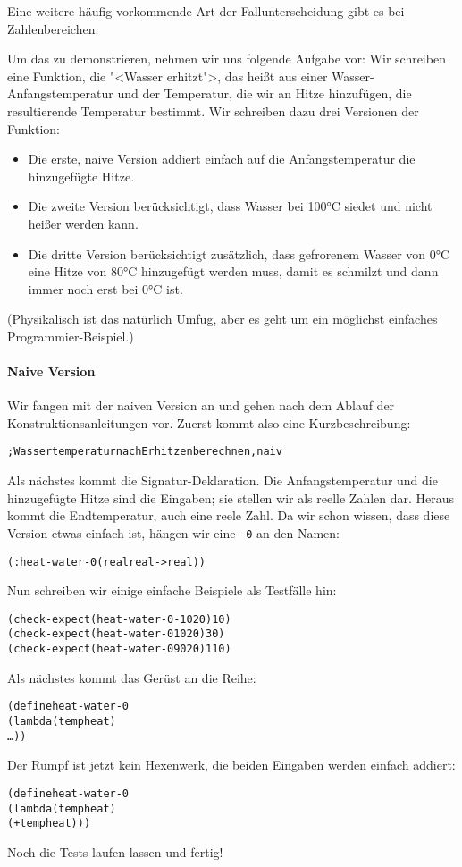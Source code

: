 Eine weitere häufig vorkommende Art der Fallunterscheidung gibt es bei
Zahlenbereichen.

Um das zu demonstrieren, nehmen wir uns folgende Aufgabe vor: Wir
schreiben eine Funktion, die "<Wasser erhitzt">, das heißt aus einer
Wasser-Anfangstemperatur und der Temperatur, die wir an Hitze hinzufügen, die
resultierende Temperatur bestimmt.  Wir schreiben dazu drei Versionen der
Funktion:
%
\begin{itemize}
\item Die erste, naive Version addiert einfach auf die
  Anfangstemperatur die hinzugefügte Hitze.
\item Die zweite Version berücksichtigt, dass Wasser bei 100°C siedet
  und nicht heißer werden kann.
\item Die dritte Version berücksichtigt zusätzlich, dass gefrorenem
  Wasser von 0°C eine Hitze von 80°C hinzugefügt werden muss, damit es
  schmilzt und dann immer noch erst bei 0°C ist.
\end{itemize}
%
(Physikalisch ist das natürlich Umfug, aber es geht
um ein möglichst einfaches Programmier-Beispiel.)

\paragraph{Naive Version} Wir fangen mit der naiven Version an und gehen nach dem Ablauf der
Konstruktionsanleitungen vor.  Zuerst kommt also eine
Kurzbeschreibung:
%
\begin{alltt}
; Wassertemperatur nach Erhitzen berechnen, naiv
\end{alltt}
%
Als nächstes kommt die Signatur-Deklaration.  Die Anfangstemperatur
und die hinzugefügte Hitze sind die Eingaben; sie stellen wir als
reelle Zahlen dar.  Heraus kommt die Endtemperatur, auch eine reele
Zahl.  Da wir schon wissen, dass diese Version etwas einfach ist,
hängen wir eine \texttt{-0} an den Namen:
%
\begin{alltt}
(: heat-water-0 (real real -> real))
\end{alltt}                
%
Nun schreiben wir einige einfache Beispiele als Testfälle hin:
%
\begin{alltt}
(check-expect (heat-water-0 -10 20) 10)
(check-expect (heat-water-0 10 20) 30)
(check-expect (heat-water-0 90 20) 110)
\end{alltt}
%
Als nächstes kommt das Gerüst an die Reihe:
%
\begin{alltt}
(define heat-water-0
  (lambda (temp heat)
    \ldots))
\end{alltt}
%
Der Rumpf ist jetzt kein Hexenwerk, die beiden Eingaben werden
einfach addiert:
%
\begin{alltt}
(define heat-water-0
  (lambda (temp heat)
    (+ temp heat)))
\end{alltt}
%
Noch die Tests laufen lassen und fertig!

